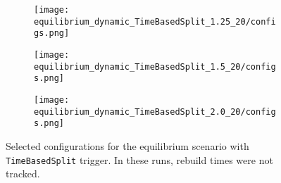 \documentclass[]{article}
\begin{document}
\begin{figure}[H]
	\begin{center}
		\begin{subfigure}[b]{0.3\textwidth}
			\texttt{[image: equilibrium\_dynamic\_TimeBasedSplit\_1.25\_20/configs.png]}
		\end{subfigure}
		\begin{subfigure}[b]{0.3\textwidth}
			\texttt{[image: equilibrium\_dynamic\_TimeBasedSplit\_1.5\_20/configs.png]}
		\end{subfigure}
		\begin{subfigure}[b]{0.3\textwidth}
			\texttt{[image: equilibrium\_dynamic\_TimeBasedSplit\_2.0\_20/configs.png]}
		\end{subfigure}
	\end{center}
	\caption[]{Selected configurations for the equilibrium scenario with \texttt{TimeBasedSplit} trigger. In these runs, rebuild times were not tracked.}
	\label{fig_equil_configs_dyn_split_no_rebuild}
\end{figure}
\end{document}
